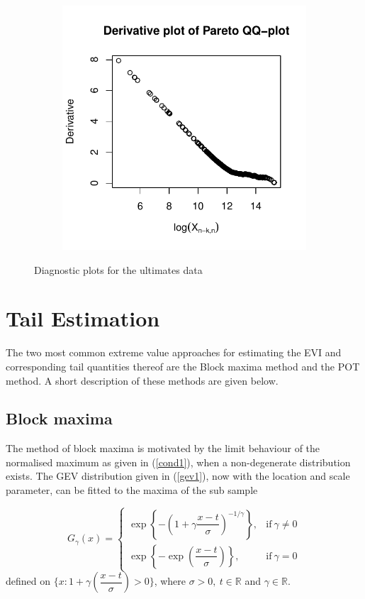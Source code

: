 \begin{figure}[hh!]
\begin{subfigure}[t]{0.45\textwidth}
	\end{subfigure}
		\hfill
		\begin{subfigure}[t]{0.45\textwidth}
		\includegraphics[width=\textwidth]{./plots/ParetoQQ_der.pdf}
	\end{subfigure}
	\caption{Diagnostic plots for the ultimates data}
	\label{diagnostics}
\end{figure}

\newpage
\section{Tail Estimation}
The two most common extreme value approaches for estimating the EVI and corresponding tail quantities thereof are the Block maxima method and the POT method. A short description of these methods are given below. 
\subsection{Block maxima}
The method of block maxima is motivated by the limit behaviour of the normalised maximum as given in (\ref{cond1}), when a non-degenerate distribution exists. The GEV distribution given in (\ref{gev1}), now with the location and scale parameter, can be fitted to the maxima of the sub sample \citep{gumbel1958}

\begin{equation}
G_{\gamma}(x) = 
\begin{cases}
 \exp\left\{ -\left( 1+\gamma\dfrac{x-t}{\sigma} \right)^{-1/\gamma} \right \}, & \text{if}\ \gamma\neq0 \\
 \exp\left\{-\exp\left(\dfrac{x-t}{\sigma} \right) \right\}, & \text{if}\ \gamma=0
\end{cases}
\end{equation}defined on $\{x: 1+\gamma(\dfrac{x-t}{\sigma}) > 0\}$, where $\sigma > 0,\ t \in \mathbb{R}$ and $\gamma \in \mathbb{R}$.

